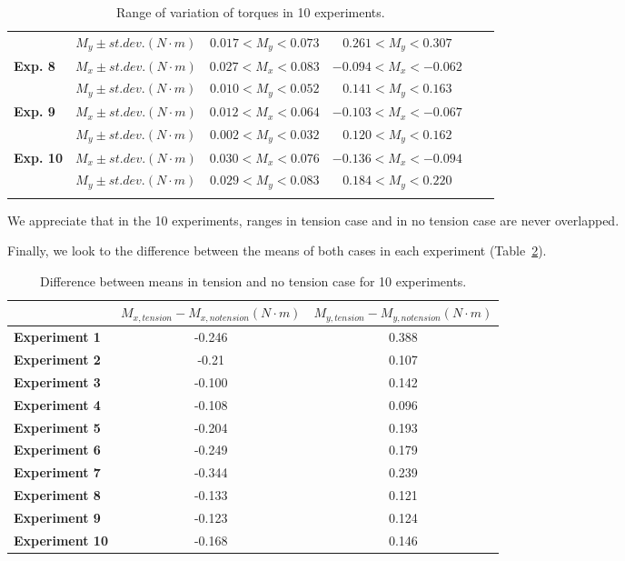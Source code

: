 \begin{longtable} {|r|c|c|c|c|c|}
		& \textbf{$M_{y} \pm st. dev. (N \cdot m)$} & $0.017 < M_{y} < 0.073$ & $0.261 < M_{y} < 0.307$ \\
		\cmidrule{1-4}
		\multicolumn{1}{|l|}{\textbf{Exp. 8}} & \textbf{$M_{x} \pm st. dev. (N \cdot m)$} & $0.027 < M_{x} < 0.083$ & $-0.094 < M_{x} < -0.062$ \\
		& \textbf{$M_{y} \pm st. dev. (N \cdot m)$} & $0.010 < M_{y} < 0.052$ & $0.141 < M_{y} < 0.163$ \\
		\cmidrule{1-4}
		\multicolumn{1}{|l|}{\textbf{Exp. 9}} & \textbf{$M_{x} \pm st. dev. (N \cdot m)$} & $0.012 < M_{x} < 0.064$ & $-0.103 < M_{x} < -0.067$ \\
		& \textbf{$M_{y} \pm st. dev. (N \cdot m)$} & $0.002 < M_{y} < 0.032$ & $0.120 < M_{y} < 0.162$ \\
		\cmidrule{1-4}
		\multicolumn{1}{|l|}{\textbf{Exp. 10}} & \textbf{$M_{x} \pm st. dev. (N \cdot m)$} & $0.030 < M_{x} < 0.076$ & $-0.136 < M_{x} < -0.094$ \\
		& \textbf{$M_{y} \pm st. dev. (N \cdot m)$} & $0.029 < M_{y} < 0.083$ & $0.184 < M_{y} < 0.220$ \\
		\bottomrule
	\caption{Range of variation of torques in 10 experiments.}
	\label{tab:rangetorques}%
\end{longtable}%

We appreciate that in the 10 experiments, ranges in tension case and in no tension case are never overlapped. 

Finally, we look to the difference between the means of both cases in each experiment (Table~\ref{tab:meandifference}).
\begin{table}[htbp]
	\centering
	\begin{tabular}{|l|c|c|}
		\cmidrule{2-3}    \multicolumn{1}{r|}{} & \textbf{$M_{x, tension} - M_{x, no tension} (N \cdot m)$} & \textbf{$M_{y, tension} - M_{y, no tension} (N \cdot m)$} \\
		\midrule 
		\textbf{Experiment 1} & -0.246 & 0.388 \\
		\midrule
		\textbf{Experiment 2} & -0.21 & 0.107 \\
		\midrule
		\textbf{Experiment 3} & -0.100 & 0.142 \\
		\midrule
		\textbf{Experiment 4} & -0.108 & 0.096 \\
		\midrule
		\textbf{Experiment 5} & -0.204 & 0.193 \\
		\midrule
		\textbf{Experiment 6} & -0.249 & 0.179 \\
		\midrule
		\textbf{Experiment 7} & -0.344 & 0.239 \\
		\midrule
		\textbf{Experiment 8} & -0.133 & 0.121 \\
		\midrule
		\textbf{Experiment 9} & -0.123 & 0.124 \\
		\midrule
		\textbf{Experiment 10} & -0.168 & 0.146 \\
		\bottomrule
	\end{tabular}%
	\caption{Difference between means in tension and no tension case for 10 experiments.}
	\label{tab:meandifference}%
\end{table}%

